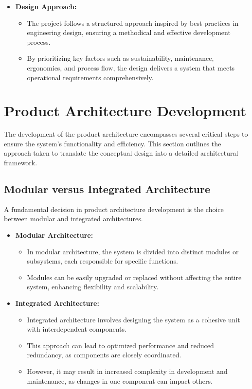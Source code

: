 \documentclass[12pt]{article}
\begin{document}
\begin{itemize}
    \item \textbf{Design Approach:}
    \begin{itemize}
        \item The project follows a structured approach inspired by best practices in engineering design, ensuring a methodical and effective development process.
        \item By prioritizing key factors such as sustainability, maintenance, ergonomics, and process flow, the design delivers a system that meets operational requirements comprehensively.
    \end{itemize}
\end{itemize}


\newpage
\section{Product Architecture Development}
\label{sec:product_architecture}

The development of the product architecture encompasses several critical steps to ensure the system's functionality and efficiency. This section outlines the approach taken to translate the conceptual design into a detailed architectural framework.

\subsection{Modular versus Integrated Architecture}
\label{subsec:architecture_types}

A fundamental decision in product architecture development is the choice between modular and integrated architectures. 

\begin{itemize}
    \item \textbf{Modular Architecture:}
    \begin{itemize}
        \item In modular architecture, the system is divided into distinct modules or subsystems, each responsible for specific functions.
        \item Modules can be easily upgraded or replaced without affecting the entire system, enhancing flexibility and scalability.
    \end{itemize}
    
    \item \textbf{Integrated Architecture:}
    \begin{itemize}
        \item Integrated architecture involves designing the system as a cohesive unit with interdependent components.
        \item This approach can lead to optimized performance and reduced redundancy, as components are closely coordinated.
        \item However, it may result in increased complexity in development and maintenance, as changes in one component can impact others.
    \end{itemize}
\end{itemize}
\end{document}
